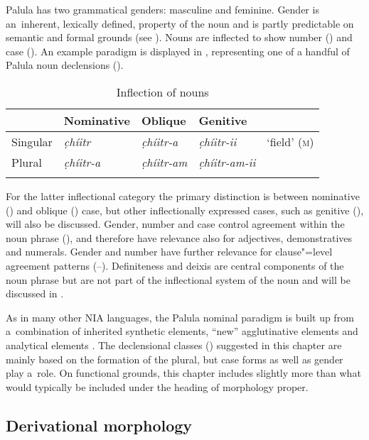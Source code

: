 Palula has two grammatical genders: masculine and feminine. Gender is an~inherent, lexically defined, property of the noun and is partly predictable on semantic and formal grounds (see ). Nouns are inflected to show number () and case  (). An example paradigm is displayed in , representing one of a handful of Palula noun declensions (). 


\begin{table}[ht]
\caption{Inflection of nouns}
\begin{tabularx}{\textwidth}{ Q Q Q Q Q }
\lsptoprule
&
Nominative &
Oblique &
Genitive &
\\\hline
Singular &
\textit{c̣híitr} &
\textit{c̣híitr-a} &
\textit{c̣híitr-ii} &
`field' (\textsc{m})\\
Plural &
\textit{c̣híitr-a} &
\textit{c̣híitr-am} &
\textit{c̣híitr-am-ii} &
\\\lspbottomrule
\end{tabularx}
\label{tab:4-nouns}
\end{table}


For the latter inflectional category the primary distinction is between nominative () and oblique () case, but other inflectionally expressed cases, such as genitive (), will also be discussed. Gender, number and case control agreement within the noun phrase (), and therefore have relevance also for adjectives, demonstratives and numerals. Gender and number have further relevance for clause"=level agreement patterns (--). Definiteness and deixis are central components of the noun phrase but are not part of the inflectional system of the noun and will be discussed in .


As in many other NIA languages, the Palula nominal paradigm is built up from a~combination of inherited synthetic elements, ``new'' agglutinative elements and analytical elements \citep[212]{masica1991}. The declensional classes () suggested in this chapter are mainly based on the formation of the plural, but case forms as well as gender play a~role. On functional grounds, this chapter includes slightly more than what would typically be included under the heading of morphology proper.


\subsection{Derivational morphology}
\label{subsec:4-2-2}


